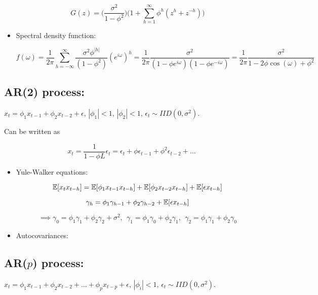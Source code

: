 \begin{itemize}
\[
G(z) = \bigg( \frac{\sigma^2}{1 - \phi ^2} \bigg) \bigg( 1 + \sum_{h=1}^\infty \phi^h(z^h + z^{-h}) \bigg)
\]


\item Spectral density function: 

\[
f(\omega) = \frac{1}{2\pi} \sum_{h=-\infty}^\infty \frac{\sigma^2 \phi^{|h|}}{(1 - \phi^2)} (e^{i \omega})^h = \frac{1}{2\pi} \frac{\sigma^2}{(1 - \phi e^{i \omega})(1 - \phi e^{- i \omega})} = \frac{1}{2 \pi} \frac{\sigma^2}{1 - 2 \phi \cos(\omega) + \phi^2}
\]


\end{itemize}


\subsection{AR(2) process:} \(x_t = \phi_1x_{t-1} + \phi_2x_{t-2} + \epsilon\), \(|\phi_1| < 1\), \(|\phi_2| < 1\), \(\epsilon_t \sim IID(0, \sigma^2)\). 

Can be written as 

\[
x_t = \frac{1}{1 - \phi L} \epsilon_t = \epsilon_t + \phi \epsilon_{t-1} + \phi^2 \epsilon_{t-2} + \ldots
\]

\begin{itemize}

\item Yule-Walker equations:

\[
\mathbb{E}[x_tx_{t-h} ]= \mathbb{E}[ \phi_1x_{t-1}x_{t-h}] +\mathbb{E}[ \phi_2x_{t-2}x_{t-h}] + \mathbb{E}[ \epsilon x_{t-h}]
\]

\[
\gamma_h = \phi_1 \gamma_{h-1} + \phi_2 \gamma_{h-2} + \mathbb{E}[ \epsilon x_{t-h}]
\]

\[
\implies \boxed{ \gamma_0 = \phi_1 \gamma_1 + \phi_2 \gamma_2 +\sigma^2,  \ \ \gamma_1 = \phi_1 \gamma_{0} + \phi_2 \gamma_{1}, \ \ \gamma_2 = \phi_1 \gamma_{1} + \phi_2 \gamma_{0}  }
\]

\item Autocovariances:

\end{itemize}


\subsection{AR(\(p\)) process:} \(x_t = \phi_1x_{t-1} + \phi_2x_{t-2} + \ldots + \phi_p x_{t-p} + \epsilon\), \(|\phi_i| < 1\), \(\epsilon_t \sim IID(0, \sigma^2)\). 

